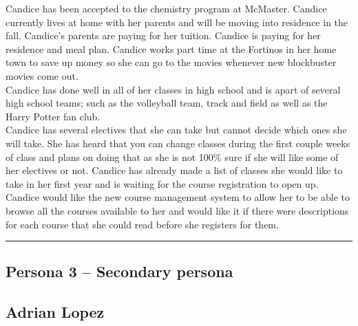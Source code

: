 \documentclass[12pt]{article}
\begin{document}
Candice has been accepted to the chemistry program at McMaster. Candice currently lives at home with her parents and will be moving into residence in the fall. Candice's parents are paying for her tuition. Candice is paying for her residence and meal plan. Candice works part time at the Fortinos in her home town to save up money so she can go to the movies whenever new blockbuster movies come out.\\

Candice has done well in all of her classes in high school and is apart of several high school teams; such as the volleyball team, track and field as well as the Harry Potter fan club.\\

Candice has several electives that she can take but cannot decide which ones she will take. She has heard that you can change classes during the first couple weeks of class and plans on doing that as she is not 100\% sure if she will like some of her electives or not. Candice has already made a list of classes she would like to take in her first year and is waiting for the course registration to open up. Candice would like the new course management system to allow her to be able to browse all the courses available to her and would like it if there were descriptions for each course that she could read before she registers for them.

\newpage
\hrule
\vspace{2mm}
\subsection{Persona 3 -- Secondary persona}
\vspace{11mm}

\subsection*{Adrian Lopez}
\vspace{4mm}
\end{document}

